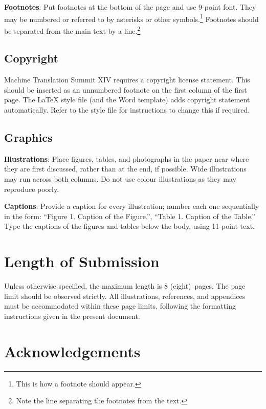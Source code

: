 \documentclass[11pt]{article}
\newcommand{\confname}{Machine Translation Summit XIV}
\newcommand{\paperlength}{$8$ (eight)}
\newcommand{\shortpaperlength}{$4$ (four)}
\begin{document}
{\bf Footnotes}: Put footnotes at the bottom of the page and use
9-point font. They may be numbered or referred to by asterisks or
other symbols.\footnote{This is how a footnote should appear.}
Footnotes should be separated from the main text by a
line.\footnote{Note the line separating the footnotes from the text.}

\subsection{Copyright}

\confname{} requires a copyright license statement. This should be inserted as
an unnumbered footnote on the first column of the first page. The \LaTeX{} style file
(and the Word template) adds copyright statement automatically. Refer to the style file for instructions to
change this if required.

\subsection{Graphics}

{\bf Illustrations}: Place figures, tables, and photo\-graphs in the
paper near where they are first discussed, rather than at the end, if
possible.  Wide illustrations may run across both columns. Do not use
colour illustrations as they may reproduce poorly.

{\bf Captions}: Provide a caption for every illustration; number
each one sequentially in the form:  ``Figure 1. Caption of the
Figure.'', ``Table 1. Caption of the Table.''  Type the captions of
the figures and tables below the body, using 11-point text.


\section{Length of Submission}
\label{sec:length}

Unless otherwise specified, the maximum length is \paperlength~pages. 
The page limit should be
observed strictly. All illustrations, references, and appendices must be
accommodated within these page limits, following the formatting instructions
given in the present document.

\section*{Acknowledgements}
\end{document}
